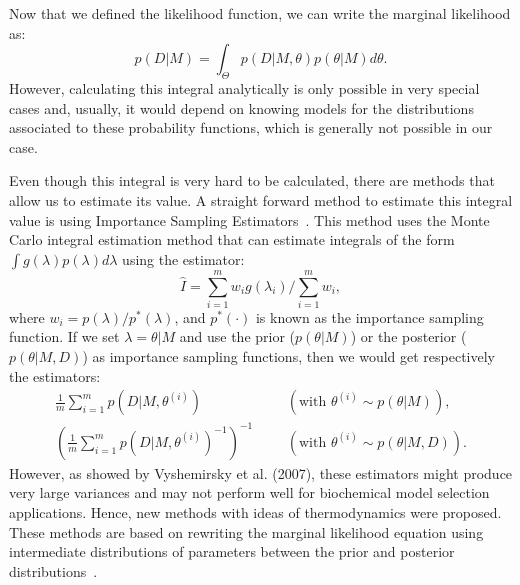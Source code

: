 Now that we defined the likelihood function, we can write the marginal 
likelihood as:
\begin{equation}
    p (D | M) = \int_{\Theta} p (D | M, \theta) p (\theta | M)d\theta.
\label{eq:marginal_likelihood}
\end{equation}
However, calculating this integral analytically is only possible in 
very special cases and, usually, it would depend on knowing models for 
the distributions associated to these probability functions, which is 
generally not possible in our case.

Even though this integral is very hard to be calculated, there are 
methods that allow us to estimate its value. A straight forward method 
to estimate this integral value is using Importance Sampling 
Estimators~\cite{Newton1993}. This method uses the Monte Carlo integral 
estimation method that can estimate integrals of the form 
$\int g(\lambda) p(\lambda)d\lambda$ using the estimator:
\begin{equation*}
    \hat{I} = \sum_{i = 1}^m w_i g(\lambda_i) / \sum_{i = 1}^m w_i,
\label{eq:importance_sampling_estimator}
\end{equation*}
where $w_i = p (\lambda) / p^* (\lambda)$, and $p^*(\cdot)$ is known as 
the importance sampling function. If we set $\lambda = \theta | M$ and
use the prior ($p(\theta | M)$) or the posterior ($p(\theta | M, D)$) as 
importance sampling functions, then we would get respectively the 
estimators:
\begin{equation*}
\begin{aligned}
    \frac{1}{m} \sum_{i = 1}^m p(D|M, \theta^{(i)}) &&& 
        (\text{with } \theta^{(i)} \sim p(\theta|M)), \\
    \left(\frac{1}{m} \sum_{i = 1}^m p(D|M, \theta^{(i)})^{-1} \right)^{-1} &&&
        (\text{with } \theta^{(i)} \sim p(\theta|M, D)).
\end{aligned}
\end{equation*}
However, as showed by Vyshemirsky et al. (2007), these estimators might
produce very large variances and may not perform well for biochemical
model selection applications. Hence, new methods with ideas of 
thermodynamics were proposed. These methods are based on rewriting the
marginal likelihood equation using intermediate distributions of 
parameters between the prior and posterior 
distributions~\cite{Friel2008}.

